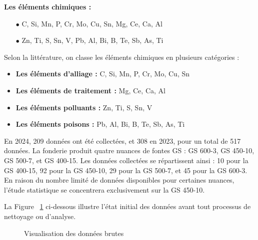 \documentclass[12pt]{article}
\begin{document}
\vspace{0.5cm}

\newpage
\textbf{Les éléments chimiques :}

\begin{itemize}
\item[$\bullet$] C, Si, Mn, P, Cr, Mo, Cu, Sn, Mg, Ce, Ca, Al 
\item[$\bullet$] Zn, Ti, S, Sn, V, Pb, Al, Bi, B, Te, Sb, As, Ti 
\end{itemize}


Selon la littérature, on classe les éléments chimiques en plusieurs catégories :
\begin{itemize}
    \item \textbf{Les éléments d'alliage :}  C, Si, Mn, P, Cr, Mo, Cu, Sn 
    \item \textbf{Les éléments de traitement :} Mg, Ce, Ca, Al
    \item \textbf{Les éléments polluants :}  Zn, Ti, S, Sn, V 
    \item \textbf{Les éléments poisons :}  Pb, Al, Bi, B, Te, Sb, As, Ti
\end{itemize}




En 2024, 209 données ont été collectées, et 308 en 2023, pour un total de 
517 données. La fonderie produit quatre nuances de fontes GS : GS 600-3, 
GS 450-10, GS 500-7, et GS 400-15. Les données collectées se répartissent 
ainsi : 10 pour la GS 400-15, 92 pour la GS 450-10, 29 pour la GS 500-7, 
et 45 pour la GS 600-3. En raison du nombre limité de données disponibles 
pour certaines nuances, l'étude statistique se concentrera exclusivement 
sur la GS 450-10.





La Figure ~\ref{fig:donnees_brutes} ci-dessous illustre l'état initial des données avant tout 
processus de nettoyage ou d'analyse.


\begin{figure}[H]
    \centering
    \caption{Visualisation des données brutes}
    \label{fig:donnees_brutes}
\end{figure}
\end{document}
